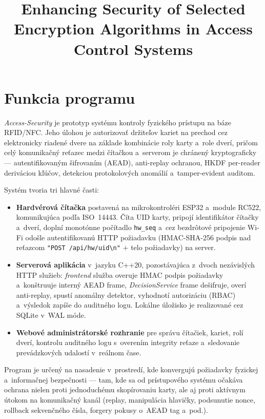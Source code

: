 \documentclass[a4paper]{feidipsp}
\title{Enhancing Security of Selected Encryption Algorithms in Access Control Systems}
\begin{document}


\titulnastrana

\tableofcontents

\newpage

\listoftables

\newpage

\setcounter{page}{1}

\section{Funkcia programu}

\emph{Access-Security} je prototyp systému kontroly fyzického prístupu na báze RFID/NFC. Jeho úlohou je autorizovať držiteľov kariet na prechod cez elektronicky riadené dvere na základe kombinácie roly karty a~role dverí, pričom celý komunikačný reťazec medzi čítačkou a~serverom je chránený kryptograficky --- autentifikovaným šifrovaním (AEAD)\cite{RFC8439}, anti-replay ochranou, HKDF per-reader deriváciou kľúčov\cite{RFC5869}, detekciou protokolových anomálií\cite{NIST80094} a~tamper-evident auditom\cite{SchneierKelsey1999}.

Systém tvoria tri hlavné časti:

\begin{itemize}
\item \textbf{Hardvérová čítačka} postavená na mikrokontroléri ESP32\cite{Espressif2024} a~module RC522, komunikujúca podľa ISO~14443\cite{ISO14443}. Číta UID karty, pripojí identifikátor čítačky a~dverí, doplní monotónne počítadlo \texttt{hw\_seq} a~cez bezdrôtové pripojenie Wi-Fi odošle autentifikovanú HTTP požiadavku (HMAC-SHA-256\cite{FIPS1981} podpis nad reťazcom \texttt{"POST /api/hw/uid\textbackslash n"} $+$ telo požiadavky) na server.
\item \textbf{Serverová aplikácia} v~jazyku C++20, pozostávajúca z~dvoch nezávislých HTTP služieb: \emph{frontend} služba overuje HMAC podpis požiadavky a~konštruuje interný AEAD frame, \emph{DecisionService} frame dešifruje, overí anti-replay, spustí anomálny detektor, vyhodnotí autorizáciu (RBAC) a~výsledok zapíše do auditného logu. Lokálne úložisko je realizované cez SQLite\cite{SQLiteSec} v~WAL móde.
\item \textbf{Webové administrátorské rozhranie} pre správu čítačiek, kariet, rolí dverí, kontrolu auditného logu s~overením integrity reťaze a~sledovanie prevádzkových udalostí v~reálnom čase.
\end{itemize}

Program je určený na nasadenie v~prostredí, kde konvergujú požiadavky fyzickej a~informačnej bezpečnosti --- tam, kde sa od prístupového systému očakáva ochrana nielen proti jednoduchému skopírovaniu karty, ale aj proti aktívnym útokom na komunikačný kanál (replay, manipulácia hlavičky, podsunutie nonce, rollback sekvenčného čísla, forgery pokusy o~AEAD tag a~pod.).
\end{document}
